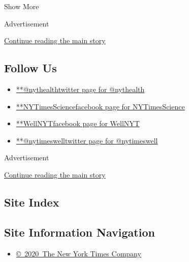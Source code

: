 Show More

Advertisement

\protect\hyperlink{after-mid3}{Continue reading the main story}

\hypertarget{follow-us}{%
\subsection{Follow Us}\label{follow-us}}

\begin{itemize}
\tightlist
\item
  \href{https://twitter.com/nythealth}{**@nythealthtwitter page for
  @nythealth}
\item
  \href{https://www.facebookcorewwwi.onion/NYTimesScience}{**NYTimesSciencefacebook
  page for NYTimesScience}
\item
  \href{https://www.facebookcorewwwi.onion/WellNYT}{**WellNYTfacebook
  page for WellNYT}
\item
  \href{https://twitter.com/nytimeswell}{**@nytimeswelltwitter page for
  @nytimeswell}
\end{itemize}

Advertisement

\protect\hyperlink{after-mktg}{Continue reading the main story}

\hypertarget{site-index}{%
\subsection{Site Index}\label{site-index}}

\hypertarget{site-information-navigation}{%
\subsection{Site Information
Navigation}\label{site-information-navigation}}

\begin{itemize}
\tightlist
\item
  \href{https://help.nytimes3xbfgragh.onion/hc/en-us/articles/115014792127-Copyright-notice}{©~2020~The
  New York Times Company}
\end{itemize}

